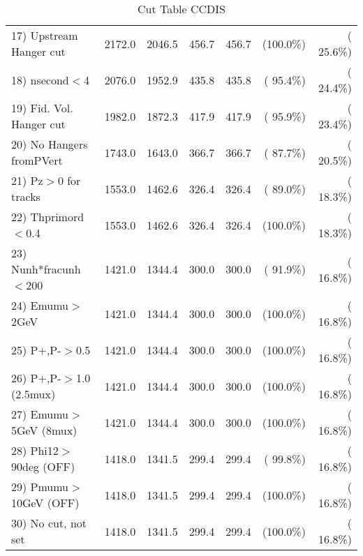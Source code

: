 \begin{table}[h!]
\begin{tabular}{||l||r|r|r|r|r|r||}
 17) Upstream Hanger cut  &       2172.0 &       2046.5 &        456.7 &        456.7 & (100.0\%) & ( 25.6\%) \\
 18) nsecond$<$4          &       2076.0 &       1952.9 &        435.8 &        435.8 & ( 95.4\%) & ( 24.4\%) \\
 19) Fid. Vol. Hanger cut &       1982.0 &       1872.3 &        417.9 &        417.9 & ( 95.9\%) & ( 23.4\%) \\
 20) No Hangers fromPVert &       1743.0 &       1643.0 &        366.7 &        366.7 & ( 87.7\%) & ( 20.5\%) \\
 21) Pz$>$0 for tracks    &       1553.0 &       1462.6 &        326.4 &        326.4 & ( 89.0\%) & ( 18.3\%) \\
 22) Thprimord$<$0.4      &       1553.0 &       1462.6 &        326.4 &        326.4 & (100.0\%) & ( 18.3\%) \\
 23) Nunh*fracunh$<$200   &       1421.0 &       1344.4 &        300.0 &        300.0 & ( 91.9\%) & ( 16.8\%) \\
 24) Emumu$>$2GeV         &       1421.0 &       1344.4 &        300.0 &        300.0 & (100.0\%) & ( 16.8\%) \\
 25) P+,P-$>$0.5          &       1421.0 &       1344.4 &        300.0 &        300.0 & (100.0\%) & ( 16.8\%) \\
 26) P+,P-$>$1.0 (2.5mux) &       1421.0 &       1344.4 &        300.0 &        300.0 & (100.0\%) & ( 16.8\%) \\
 27) Emumu$>$5GeV  (8mux) &       1421.0 &       1344.4 &        300.0 &        300.0 & (100.0\%) & ( 16.8\%) \\
 28) Phi12$>$90deg  (OFF) &       1418.0 &       1341.5 &        299.4 &        299.4 & ( 99.8\%) & ( 16.8\%) \\
 29) Pmumu$>$10GeV  (OFF) &       1418.0 &       1341.5 &        299.4 &        299.4 & (100.0\%) & ( 16.8\%) \\
 30) No cut, not set      &       1418.0 &       1341.5 &        299.4 &        299.4 & (100.0\%) & ( 16.8\%) \\
 \hline
 \hline
 \end{tabular}
 \caption{Cut Table  CCDIS    }
 \label{tab-cutcohjpsi-mumu_ncdis}
 \end{table}

